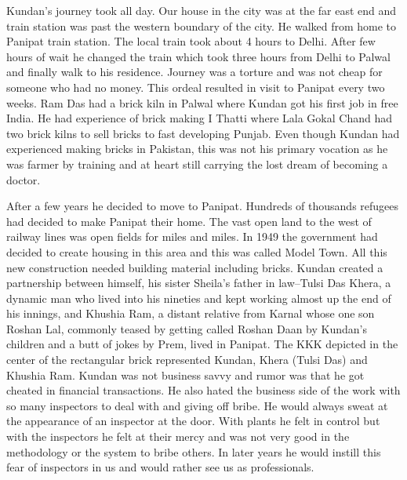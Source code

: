 Kundan’s journey took all day. Our house in the city was at the far east end and train station was past the western boundary of the city. He walked from home to Panipat train station. The local train took about 4 hours to Delhi. After few hours of wait he changed the train which took three hours from Delhi to Palwal and finally walk to his residence. Journey was a torture and was not cheap for someone who had no money. This ordeal resulted in visit to Panipat every two weeks. 
Ram Das had a brick kiln in Palwal where Kundan got his first job in free India. He had experience of brick making I Thatti where Lala Gokal Chand had two brick kilns to sell bricks to fast developing Punjab. Even though Kundan had experienced making bricks in Pakistan, this was not his primary vocation as he was farmer by training and at heart still carrying the lost dream of becoming a doctor. 

After a few years he decided to move to Panipat. Hundreds of thousands refugees had decided to make Panipat their home. The vast open land to the west of railway lines was open fields for miles and miles. In 1949 the government had decided to create housing in this area and this was called Model Town. All this new construction needed building material including bricks. Kundan created a partnership between himself, his sister Sheila's father in law--Tulsi Das Khera, a dynamic man who lived into his nineties and kept working almost up the end of his innings, and Khushia Ram, a distant relative from Karnal whose one son Roshan Lal, commonly teased by getting called Roshan Daan by Kundan's children and a butt of jokes by Prem, lived in Panipat. The KKK depicted in the center of the rectangular brick represented Kundan, Khera (Tulsi Das) and Khushia Ram. 
Kundan was not business savvy and rumor was that he got cheated in financial transactions. He also hated the business side of the work with so many inspectors to deal with and giving off bribe. He would always sweat at the appearance of an inspector at the door. With plants he felt in control but with the inspectors he felt at their mercy and was not very good in the methodology or the system to bribe others. In later years he would instill this fear of inspectors in us and would rather see us as professionals. 

